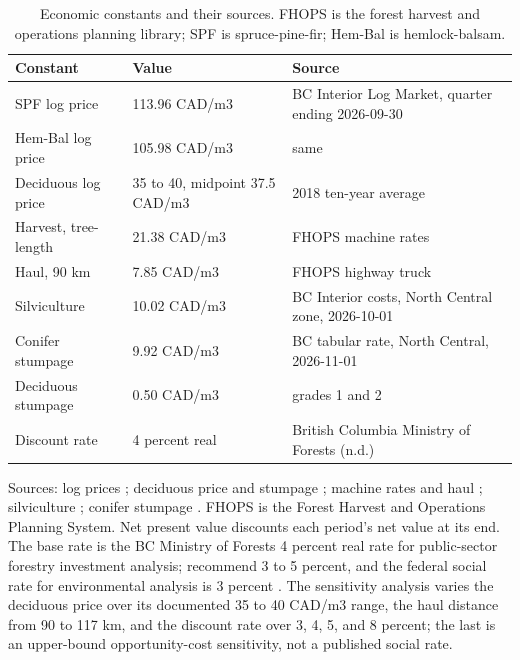 \begin{table}[h]
    \centering
    \small
    \caption{Economic constants and their sources. FHOPS is the forest harvest and operations
    planning library; SPF is spruce-pine-fir; Hem-Bal is hemlock-balsam.}
    \label{tab:supp_constants}
    \begin{tabular}{lll}
        \toprule
        Constant & Value & Source \\
        \midrule
        SPF log price            & 113.96 CAD/m3 & BC Interior Log Market, quarter ending 2026-09-30 \\
        Hem-Bal log price        & 105.98 CAD/m3 & same \\
        Deciduous log price      & 35 to 40, midpoint 37.5 CAD/m3 & 2018 ten-year average \\
        Harvest, tree-length     & 21.38 CAD/m3 & FHOPS machine rates \\
        Haul, 90 km              & 7.85 CAD/m3 & FHOPS highway truck \\
        Silviculture             & 10.02 CAD/m3 & BC Interior costs, North Central zone, 2026-10-01 \\
        Conifer stumpage         & 9.92 CAD/m3 & BC tabular rate, North Central, 2026-11-01 \\
        Deciduous stumpage       & 0.50 CAD/m3 & grades 1 and 2 \\
        Discount rate            & 4 percent real & British Columbia Ministry of Forests (n.d.)\nocite{bc_mof_silviculture_lesson4} \\
        \bottomrule
    \end{tabular}
\end{table}

Sources: log prices \citep{bc_mof_log_market_2026}; deciduous price and stumpage
\citep{ifs_aspen_2018}; machine rates and haul \citep{fhops_2026}; silviculture
\citep{bc_mof_silviculture_costs_2026}; conifer stumpage
\citep{bc_mof_tabular_stumpage_2026}. FHOPS is the Forest Harvest and Operations Planning System.
Net present value discounts each period's net value at its end. The base rate is the BC Ministry
of Forests 4 percent real rate for public-sector forestry investment analysis; \citet{heaps_pratt_1989}
recommend 3 to 5 percent, and the federal social rate for environmental analysis is 3 percent
\citep{treasury_board_2007}. The sensitivity analysis varies the deciduous price over its documented
35 to 40 CAD/m3 range, the haul distance from 90 to 117 km, and the discount rate over 3, 4, 5, and
8 percent; the last is an upper-bound opportunity-cost sensitivity, not a published social rate.

